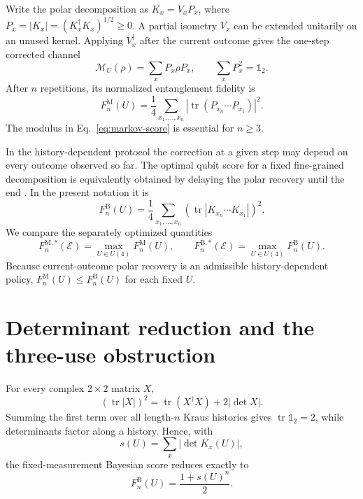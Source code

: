 \documentclass[11pt]{article}
\theoremstyle{remark}
\newcommand{\cE}{\mathcal{E}}
\newcommand{\cM}{\mathcal{M}}
\newcommand{\Tr}{\operatorname{tr}}
\newcommand{\one}{\mathbb{1}}
\begin{document}
Write the polar decomposition as $K_x=V_xP_x$, where
$P_x=|K_x|=(K_x^\dagger K_x)^{1/2}\geq0$.  A partial isometry $V_x$ can be
extended unitarily on an unused kernel.  Applying $V_x^\dagger$ after the
current outcome gives the one-step corrected channel
\begin{equation}
  \cM_U(\rho)=\sum_xP_x\rho P_x,
  \qquad \sum_xP_x^2=\one_2 .
  \label{eq:markov-channel}
\end{equation}
After $n$ repetitions, its normalized entanglement fidelity is
\begin{equation}
 F^{\mathrm M}_n(U)
 =\frac14\sum_{x_1,\ldots,x_n}
 \left|\Tr(P_{x_n}\cdots P_{x_1})\right|^2 .
 \label{eq:markov-score}
\end{equation}
The modulus in Eq.~\eqref{eq:markov-score} is essential for $n\geq3$.

In the history-dependent protocol the correction at a given step may depend
on every outcome observed so far.  The optimal qubit score for a fixed
fine-grained decomposition is equivalently obtained by delaying the polar
recovery until the end \cite{gregoratti2004}.  In the present notation it is
\begin{equation}
 F^{\mathrm B}_n(U)
 =\frac14\sum_{x_1,\ldots,x_n}
 \left(\Tr\left|K_{x_n}\cdots K_{x_1}\right|\right)^2 .
 \label{eq:bayes-score}
\end{equation}
We compare the separately optimized quantities
\begin{equation}
 F^{\mathrm M,*}_n(\cE)=\max_{U\in U(4)}F^{\mathrm M}_n(U),
 \qquad
 F^{\mathrm B,*}_n(\cE)=\max_{U\in U(4)}F^{\mathrm B}_n(U).
 \label{eq:optimized}
\end{equation}
Because current-outcome polar recovery is an admissible history-dependent
policy, $F^{\mathrm M}_n(U)\leq F^{\mathrm B}_n(U)$ for each fixed $U$.

\section{Determinant reduction and the three-use obstruction}
\label{sec:reduction}

For every complex $2\times2$ matrix $X$,
\begin{equation}
  (\Tr|X|)^2=\Tr(X^\dagger X)+2|\det X| .
  \label{eq:two-singular-values}
\end{equation}
Summing the first term over all length-$n$ Kraus histories gives
$\Tr\one_2=2$, while determinants factor along a history.  Hence, with
\begin{equation}
  s(U)=\sum_x|\det K_x(U)|,
  \label{eq:s-def}
\end{equation}
the fixed-measurement Bayesian score reduces exactly to
\begin{equation}
  F^{\mathrm B}_n(U)=\frac{1+s(U)^n}{2}.
  \label{eq:bayes-reduction}
\end{equation}
\end{document}

